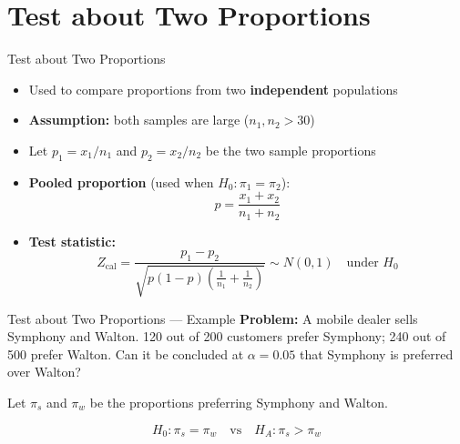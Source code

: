 \documentclass[12pt, aspectratio=169]{beamer}
\begin{document}
    \section{Test about Two Proportions}


    \begin{frame}{Test about Two Proportions}
        \begin{itemize}
            \item Used to compare proportions from two \textbf{independent} populations
            \item \textbf{Assumption:} both samples are large ($n_1, n_2 > 30$)
            \item Let $p_1 = x_1/n_1$ and $p_2 = x_2/n_2$ be the two sample proportions
            \item \textbf{Pooled proportion} (used when $H_0: \pi_1 = \pi_2$):
            \[
                p = \frac{x_1 + x_2}{n_1 + n_2}
            \]
            \item \textbf{Test statistic:}
            \[
                Z_{\text{cal}} = \frac{p_1 - p_2}{\sqrt{p(1-p)\left(\tfrac{1}{n_1}+\tfrac{1}{n_2}\right)}}
                \sim N(0,1) \quad \text{under } H_0
            \]
        \end{itemize}
    \end{frame}


    \begin{frame}{Test about Two Proportions --- Example}
        \textbf{Problem:} A mobile dealer sells Symphony and Walton.
        120 out of 200 customers prefer Symphony; 240 out of 500 prefer Walton.
        Can it be concluded at $\alpha = 0.05$ that Symphony is preferred over Walton?

        \vspace{0.8em}

        Let $\pi_s$ and $\pi_w$ be the proportions preferring Symphony and Walton.

        \[
            H_0: \pi_s = \pi_w \quad \text{vs} \quad H_A: \pi_s > \pi_w
        \]
    \end{frame}
\end{document}

